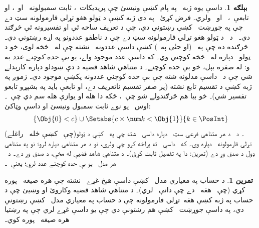 \documentclass[12pt,a4paper,oneside]{report}
\theoremstyle{definition}
\newtheorem{ex}[thm]{بېلګه}
\newtheorem{prob}[thm]{تمرين}
\begin{document}
\label{olpseg:OLP-0135-B014:start}
\begin{ex}
داسې يوه ژبه~ په پام کښې ونيسئ چې
پريديکات~\LR{$<$}، ثابت سمبولونه~ او~، او
تابعې~\LR{$+$}،~\LR{$\times$} او~\LR{$-$} ولري۔ فرض کړئ~\LR{$\Gamma$} په دې
ژبه کښې د ټولو هغو تړلي فارمولونه سټ دے چې په
جوړښت~ کښې رښتونې دي، چې د تعريف ساحه ئې
\LR{$\Rat$} او تفسيرونه ئې څرګند دي۔~\LR{$\Gamma$} د~ د ټولو هغو
تړلي فارمولونه سټ دے چې د ناطقو عددونو په اړه رښتونې دي۔ څرګنده ده
چې په~\LR{$\Rat$} (او حتٰی په~\LR{$\Real$}) کښې داسې عددونه~ نشته چې
له~ څخه لوی، خو د ټولو~ دپاره له~ څخه
کوچني وي۔ که داسې عدد موجود واے، يو \emph{بې حده کوچنے عدد} به
و: له صفره بېل، خو بې حده کوچنے۔ د متناهي شاهد قضيه د دې ښودلو
دپاره کارېدلے شي چې د~\LR{$\Gamma$} داسې مدلونه شته چې بې حده کوچني
عددونه پکښې موجود دي۔ زموږ په ژبه کښې د تقسيم تابع نشته
(پر صفر تقسيم ناتعريف دے، او تابعې بايد په بشپړو تابعو
تفسير شي)۔ خو بيا هم څرګندولے شو چې~، ځکه دا هله او يوازې
هله سم دي چې~۔ اوس~ يو نوے ثابت سمبول ونيسئ او
\LR{$\Delta$} داسې وټاکئ:
\[
\{\Obj{0} < c\}
\cup \Setabs{ c \times \num k < \Obj{1} }{k \in \PosInt}
\]
(چې~ کښې  ځله~ راغلے)۔ د~\LR{$\Delta$} د هر
متناهي فرعي سټ~ دپاره داسې~ شته چې په~
کښې د ټولو تړلي فارمولونه~ دپاره
 وي۔ که~ داسې~ ته پراخه کړو چې
 ولري، نو د هر متناهي
\LR{$\Gamma_0 \subseteq \Gamma$} دپاره
 لرو؛ نو
\LR{$\Gamma \cup \Delta$} په متناهي ډول د صدق وړ دے (تمرين: دا په
تفصيل ثابت کړئ)۔ د متناهي شاهد قضيې له مخې،
\LR{$\Gamma \cup \Delta$} د صدق وړ دے۔ د~\LR{$\Gamma \cup \Delta$} هر
مدل~ يو بې حده کوچنے عدد لري؛ يعنې~۔
\end{ex}

\label{olpseg:OLP-0135-B014:end}

\label{olpseg:OLP-0135-B015:start}
\begin{prob}
د حساب په معياري مدل~ کښې داسې هېڅ
غړے~ نشته چې هره صيغه~
پوره کړي (چې~ هغه~ دے چې
 دانې~\LR{$\prime$} لري)۔ د متناهي شاهد قضيه وکاروئ او وښيئ چې د
حساب په ژبه کښې هغه~تړلي فارمولونه چې د حساب په معياري
مدل~ کښې رښتونې دي، په داسې جوړښت~
کښې هم رښتونې دي چې يو داسې غړے لري چې په رښتيا هره
صيغه~ پوره کوي۔
\end{prob}
\label{olpseg:OLP-0135-B015:end}
\end{document}
